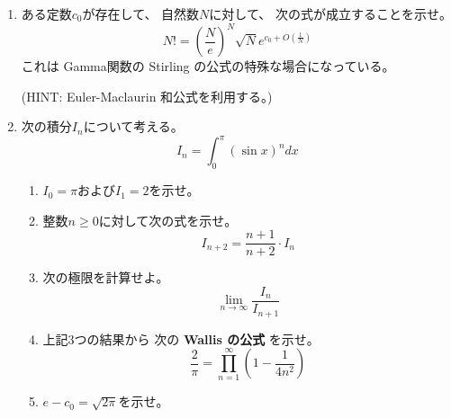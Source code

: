 \documentclass[12pt,b5paper]{ltjsarticle}
\begin{document}
\begin{enumerate}
\dotfill

\hrulefill

 \item
      ある定数$c_{0}$が存在して、
      自然数$N$に対して、
      次の式が成立することを示せ。
      \begin{equation}
       N! = \left(\frac{N}{e}\right)^{N} \sqrt{N}e^{c_{0}+O(\frac{1}{N})}
      \end{equation}
      これは Gamma関数の Stirling の公式の特殊な場合になっている。

      (HINT: Euler-Maclaurin 和公式を利用する。)

\dotfill

\hrulefill

 \item
      次の積分$I_{n}$について考える。
      \begin{equation}
       I_{n} = \int_{0}^{\pi} (\sin{x})^{n}dx
      \end{equation}

      \begin{enumerate}
       \item
            $I_{0} = \pi$および$I_{1} = 2$を示せ。

\dotfill

\hrulefill

       \item
            整数$n\geq 0$に対して次の式を示せ。
            \begin{equation}
             I_{n+2} = \frac{n+1}{n+2}\cdot I_{n}
            \end{equation}

\dotfill

\hrulefill

       \item
            次の極限を計算せよ。
            \begin{equation}
             \lim_{n\to\infty} \frac{I_{n}}{I_{n+1}}
            \end{equation}

\dotfill

\hrulefill

       \item
            上記3つの結果から
            次の
            \textbf{Wallis の公式}
            を示せ。
            \begin{equation}
             \frac{2}{\pi}
              = \prod_{n=1}^{\infty}\left( 1-\frac{1}{4n^2} \right)
            \end{equation}

\dotfill

\hrulefill


       \item
            $e-{c_{0}} = \sqrt{2\pi}$を示せ。

\dotfill

\hrulefill
            
      \end{enumerate}
\end{enumerate}


\hrulefill
\end{document}
